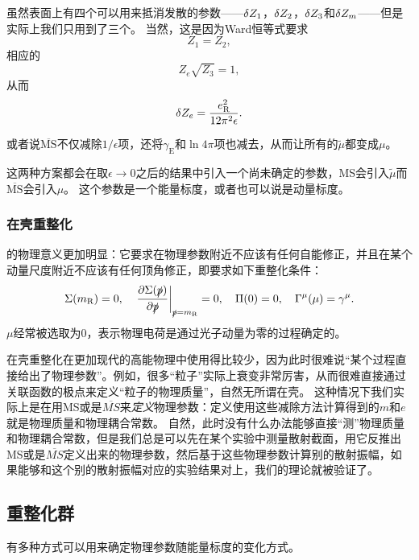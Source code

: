 虽然表面上有四个可以用来抵消发散的参数——$\var{Z_1}$，$\var{Z_2}$，$\var{Z_3}$和$\var{Z_m}$——但是实际上我们只用到了三个。
当然，这是因为Ward恒等式要求
\[
    Z_1 = Z_2,
\]
相应的
\begin{equation}
    Z_e \sqrt{Z_3} = 1,
\end{equation}
从而
\begin{equation}
    \var{Z_e} = \frac{e_\text{R}^2}{12 \pi^2 \epsilon}.
\end{equation}

或者说$\overline{\mathrm{MS}}$不仅减除$1/\epsilon$项，还将$\gamma_\text{E}$和$\ln 4\pi$项也减去，从而让所有的$\tilde{\mu}$都变成$\mu$。

这两种方案都会在取$\epsilon \to 0$之后的结果中引入一个尚未确定的参数，MS会引入$\tilde{\mu}$而$\overline{\mathrm{MS}}$会引入$\mu$。
这个参数是一个能量标度，或者也可以说是动量标度。

\subsubsection{在壳重整化}

的物理意义更加明显：它要求在物理参数附近不应该有任何自能修正，并且在某个动量尺度附近不应该有任何顶角修正，即要求如下重整化条件：
\begin{equation}
    \Sigma(m_\text{R}) = 0, \quad \eval{\pdv{\Sigma(\slashed{p})}{\slashed{p}}}_{\slashed{p} = m_\text{R}} = 0, \quad \Pi(0) = 0, \quad \Gamma^\mu(\mu) = \gamma^\mu.
\end{equation}
$\mu$经常被选取为$0$，表示物理电荷是通过光子动量为零的过程确定的。

在壳重整化在更加现代的高能物理中使用得比较少，因为此时很难说“某个过程直接给出了物理参数”。例如，很多“粒子”实际上衰变非常厉害，从而很难直接通过关联函数的极点来定义“粒子的物理质量”，自然无所谓在壳。
这种情况下我们实际上是在用MS或是$\overline{MS}$来\emph{定义}物理参数：定义使用这些减除方法计算得到的$m$和$e$就是物理质量和物理耦合常数。
自然，此时没有什么办法能够直接“测”物理质量和物理耦合常数，但是我们总是可以先在某个实验中测量散射截面，用它反推出MS或是$\overline{MS}$定义出来的物理参数，然后基于这些物理参数计算别的散射振幅，如果能够和这个别的散射振幅对应的实验结果对上，我们的理论就被验证了。

\subsection{重整化群}

有多种方式可以用来确定物理参数随能量标度的变化方式。

